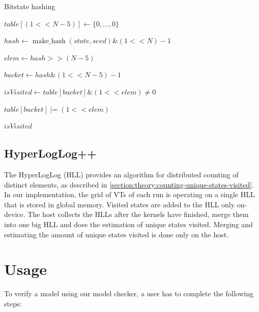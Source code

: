 \documentclass[
fancyheadings, %
%
%
]{stsreprt}
\DeclareMathOperator{\markVisited}{mark\_visited}
\newcommand{\bitwiseAnd}{\mathbin{\text{\&}}}
\begin{document}
\begin{algorithm}
    \caption{Bitstate hashing}
    \label{alg:bitstate-hashing}
    \begin{algorithmic}
        \State $table[(1 << N - 5)] \gets \{0, \dots, 0\}$

        \Statex

        \Function{$\markVisited$}{state}
        \State $hash \gets \operatorname{make\_hash}(state, seed) \bitwiseAnd (1 << N) - 1$

        \State $elem \gets hash >> (N - 5)$

        \State $bucket \gets hash \bitwiseAnd (1 << N - 5) - 1$

        \State $isVisited \gets table[bucket] \bitwiseAnd (1 << elem) \neq 0$

        \State $table[bucket] \mathbin{\text{|=}} (1 << elem)$

        \Statex

        \State \Return $isVisited$
        \EndFunction
    \end{algorithmic}
\end{algorithm}

\subsection{HyperLogLog++}

The HyperLogLog (HLL) provides an algorithm for distributed counting of distinct elements, as described in \cref{section:theory:counting-unique-states-visited}.
In our implementation, the grid of VTs of each run is operating on a single HLL that is stored in global memory.
Visited states are added to the HLL only on-device.
The host collects the HLLs after the kernels have finished, merge them into one big HLL and does the estimation of unique states visited.
Merging and estimating the amount of unique states visited is done only on the host.

\section{Usage}
\label{section:implementation:usage}

To verify a model using our model checker, a user has to complete the following steps:
\end{document}

